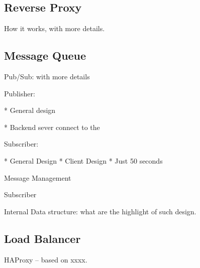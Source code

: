\subsection{Reverse Proxy\\}

How it works, with more details.

\subsection{Message Queue\\}

Pub/Sub: with more details

Publisher: 

    * General design

    * Backend sever connect to the 

Subscriber: 

    * General Design
    * Client Design
    * Just 50 seconds

Message Management

Subscriber

Internal Data structure: what are the highlight of such design.

\subsection{Load Balancer\\}

HAProxy -- based on xxxx.

